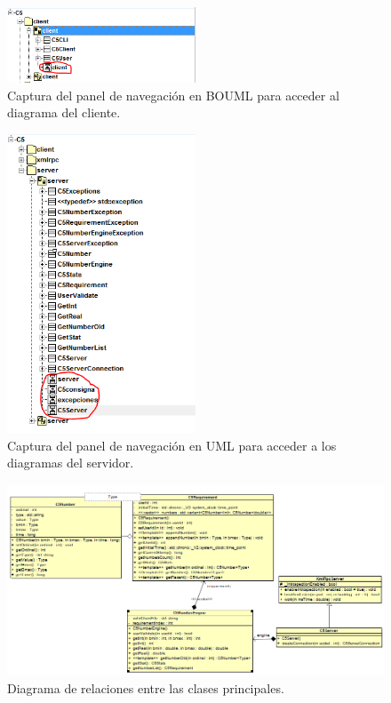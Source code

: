 \documentclass[a4paper,12pt]{article}
\begin{document}
\begin{figure}[htbp]
    \centering
    \includegraphics[width=0.5\textwidth]{C5/Esquema_general_C5_cliente_panel.PNG}
    \caption{Captura del panel de navegación en BOUML para acceder al diagrama del cliente.}
    \label{fig:navegacion_cliente}
\end{figure}

\begin{figure}[htbp]
    \centering
    \includegraphics[width=0.5\textwidth]{C5/Esquema_general_C5_server_panel.PNG}
    \caption{Captura del panel de navegación en UML para acceder a los diagramas del servidor.}
    \label{fig:navegacion_servidor}
\end{figure}

\begin{figure}[htbp]
    \centering
    \includegraphics[width=\textwidth]{C5/Esquema_general_C5_server_consigna.PNG}
    \caption{Diagrama de relaciones entre las clases principales.}
    \label{fig:relaciones_principales}
\end{figure}
\end{document}
